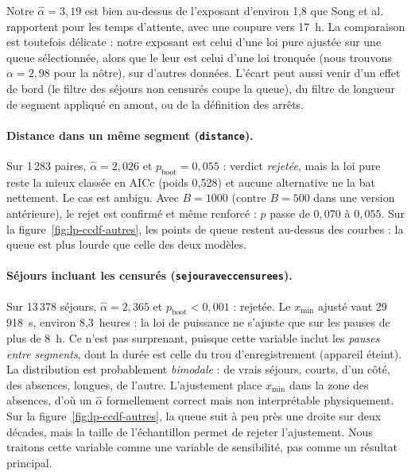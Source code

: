 \documentclass[11pt,a4paper]{article}
\newcommand{\code}[1]{\texttt{#1}}
\renewcommand{\_}{\textunderscore\penalty0\hspace{0pt}}
\begin{document}
Notre $\hat\alpha = 3{,}19$ est bien au-dessus de l'exposant d'environ 1,8 que Song et
al.~\cite{song2010} rapportent pour les temps d'attente, avec une coupure vers 17~h. La
comparaison est toutefois délicate : notre exposant est celui d'une loi pure ajustée sur une
queue sélectionnée, alors que le leur est celui d'une loi tronquée (nous trouvons
$\alpha = 2{,}98$ pour la nôtre), sur d'autres données. L'écart peut aussi venir d'un effet de
bord (le filtre des séjours non censurés coupe la queue), du filtre de longueur de segment
appliqué en amont, ou de la définition des arrêts.

\paragraph{Distance dans un même segment (\code{distance}).} Sur 1\,283 paires,
$\hat\alpha = 2{,}026$ et $p_{\text{boot}} = 0{,}055$ : verdict \emph{rejetée}, mais la loi
pure reste la mieux classée en AICc (poids 0{,}528) et aucune alternative ne la bat
nettement. Le cas est ambigu. Avec $B=1000$ (contre $B=500$ dans une version antérieure), le
rejet est confirmé et même renforcé : $p$ passe de $0{,}070$ à $0{,}055$. Sur la
figure~\ref{fig:lp-ccdf-autres}, les points de queue restent au-dessus des courbes : la
queue est plus lourde que celle des deux modèles.

\paragraph{Séjours incluant les censurés (\code{sejour\_avec\_censurees}).} Sur 13\,378
séjours, $\hat\alpha = 2{,}365$ et $p_{\text{boot}} < 0{,}001$ : rejetée. Le $x_{\min}$
ajusté vaut 29\,918~s, environ 8,3~heures : la loi de puissance ne s'ajuste que sur les pauses
de plus de 8~h. Ce n'est pas surprenant, puisque cette variable inclut les \emph{pauses
entre segments}, dont la durée est celle du trou d'enregistrement (appareil éteint). La
distribution est probablement \emph{bimodale} : de vrais séjours, courts, d'un côté, des
absences, longues, de l'autre. L'ajustement place $x_{\min}$ dans la zone des absences,
d'où un $\hat\alpha$ formellement correct mais non interprétable physiquement. Sur la
figure~\ref{fig:lp-ccdf-autres}, la queue suit à peu près une droite sur deux décades, mais
la taille de l'échantillon permet de rejeter l'ajustement. Nous traitons cette variable
comme une variable de sensibilité, pas comme un résultat principal.
\end{document}
